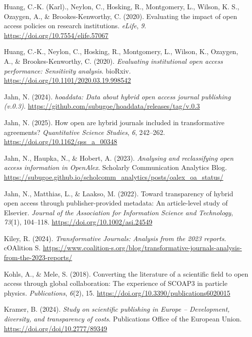 \documentclass[a4paper,man,floatsintext,longtable,noextraspace,10pt]{apa6}
\newlength{\cslhangindent}
\newenvironment{CSLReferences}[2] %
{\begin{list}{}{%
  \setlength{\itemindent}{0pt}
  \setlength{\leftmargin}{0pt}
  \setlength{\parsep}{0pt}
  \ifodd #1
  \setlength{\leftmargin}{\cslhangindent}
  \setlength{\itemindent}{-1\cslhangindent}
  \fi
  \setlength{\itemsep}{#2\baselineskip}}}
{\end{list}}
\begin{document}
\begin{CSLReferences}{1}{0}
Huang, C.-K. (Karl)., Neylon, C., Hosking, R., Montgomery, L., Wilson,
K. S., Ozaygen, A., \& Brookes-Kenworthy, C. (2020). Evaluating the
impact of open access policies on research institutions. \emph{eLife},
\emph{9}. \url{https://doi.org/10.7554/elife.57067}

Huang, C.-K., Neylon, C., Hosking, R., Montgomery, L., Wilson, K.,
Ozaygen, A., \& Brookes-Kenworthy, C. (2020). \emph{Evaluating
institutional open access performance: Sensitivity analysis}. bioRxiv.
\url{https://doi.org/10.1101/2020.03.19.998542}

Jahn, N. (2024). \emph{{hoaddata}: Data about hybrid open access journal
publishing (v.0.3)}.
\url{https://github.com/subugoe/hoaddata/releases/tag/v.0.3}

Jahn, N. (2025). How open are hybrid journals included in transformative
agreements? \emph{Quantitative Science Studies}, \emph{6}, 242--262.
\url{https://doi.org/10.1162/qss_a_00348}

Jahn, N., Haupka, N., \& Hobert, A. (2023). \emph{Analysing and
reclassifying open access information in OpenAlex}. {Scholarly
Communication Analytics Blog}.
\url{https://subugoe.github.io/scholcomm_analytics/posts/oalex_oa_status/}

Jahn, N., Matthias, L., \& Laakso, M. (2022). Toward transparency of
hybrid open access through publisher-provided metadata: An article-level
study of {Elsevier}. \emph{Journal of the Association for Information
Science and Technology}, \emph{73}(1), 104--118.
\url{https://doi.org/10.1002/asi.24549}

Kiley, R. (2024). \emph{{Transformative Journals}: Analysis from the
2023 reports}. {cOAlition S}.
\url{https://www.coalition-s.org/blog/transformative-journals-analysis-from-the-2023-reports/}

Kohls, A., \& Mele, S. (2018). Converting the literature of a scientific
field to open access through global collaboration: The experience of
SCOAP3 in particle physics. \emph{Publications}, \emph{6}(2), 15.
\url{https://doi.org/10.3390/publications6020015}

Kramer, B. (2024). \emph{Study on scientific publishing in {Europe} --
{Development}, diversity, and transparency of costs}. Publications
Office of the European Union. \url{https://doi.org/doi/10.2777/89349}


\end{CSLReferences}
\end{document}
